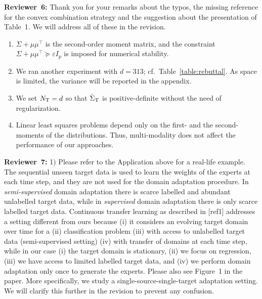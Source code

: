 \documentclass{article}
\begin{document}
\vspace{-.1cm}
{\bf Reviewer~6:} 
Thank you for your remarks about the typos, the missing reference for the convex combination strategy and the suggestion about the presentation of Table~1. We will address all of these in the revision.
\vspace{-.1cm}
\begin{enumerate}[label=\arabic*), leftmargin = 6mm, nosep]
    \item $\Sigma + \mu \mu^\top$ is the second-order moment matrix, and the constraint $\Sigma + \mu \mu^\top \succeq \varepsilon I_p$ is imposed for numerical stability.
    \item We ran another experiment with $d=313$; cf.\ Table~\ref{table:rebuttal}. As space is limited, the variance will be reported in the appendix.
    \item We set $N_{\rm T} = d$ so that $\hat \Sigma_{\rm T}$ is positive-definite without the need of regularization.
    \item Linear least squares problems depend only on the first- and the second-moments of the distributions. Thus, multi-modality does not affect the performance of our approaches. 
\end{enumerate}
\vspace{-.15cm}
{\bf Reviewer~7:} 1) Please refer to the Application above for a real-life example. The sequential unseen target data is used to learn the weights of the experts at each time step, and they are not used for the domain adaptation procedure. In \emph{semi-supervised} domain adaptation there is scarce labelled and abundant unlabelled target data, while in \emph{supervised} domain adaptation there is only scarce labelled target data. 
Continuous transfer learning as described in [ref1] addresses a setting different from ours because (i) it considers an evolving target domain over time for a (ii) classification problem (iii) with access to unlabelled target data (semi-supervised setting) (iv) with transfer of domains at each time step, while in our case (i) the target domain is stationary, (ii) we focus on regression, (iii) we have access to limited labelled target data, and (iv) we perform domain adaptation only once to generate the experts. Please also see Figure~1 in the paper. More specifically, we study a single-source-single-target adaptation setting. We will clarify this further in the revision to prevent any confusion.
\end{document}
